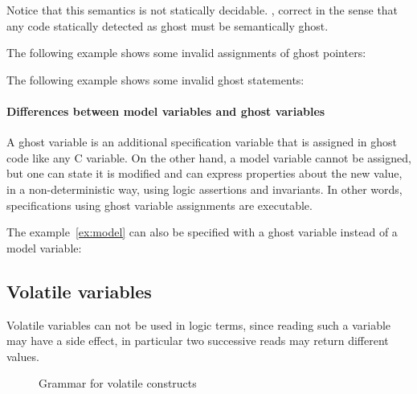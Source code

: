 Notice that this semantics is not statically decidable.
,
correct in the sense that any code
statically detected as ghost must be semantically ghost.

\begin{example}
  The following example shows some invalid assignments of ghost pointers:
\end{example}

\begin{example}
  The following example shows some invalid ghost statements:
\end{example}

\paragraph{Differences between model variables and ghost variables}

A ghost variable is an additional specification variable that is
assigned in ghost code like any C variable. On the other hand, a model
variable cannot be assigned, but one can state it is modified and can
express properties about the new value, in a non-deterministic way,
using logic assertions and invariants.
In other words, specifications using ghost variable assignments
are executable.

\begin{example}
  \label{ex:gen_code}
  The example~\ref{ex:model} can also be specified with a ghost
  variable instead of a model variable:


\end{example}

\subsection{Volatile variables}\label{sec:volatile-variables}

Volatile variables can not be used in logic terms, since reading such
a variable may have a side effect, in particular two successive reads
may return different values.

\begin{figure}[h]
  \begin{cadre}
      
    \end{cadre}
  \caption{Grammar for volatile constructs}
\label{fig:gram:volatile}
\end{figure}

